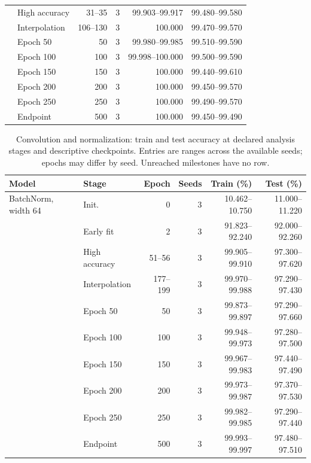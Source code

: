 \begin{table}[!htbp]
\begin{tabular}{llrrrr}
 & High accuracy & 31--35 & 3 & 99.903--99.917 & 99.480--99.580\\
 & Interpolation & 106--130 & 3 & 100.000 & 99.470--99.570\\
 & Epoch 50 & 50 & 3 & 99.980--99.985 & 99.510--99.590\\
 & Epoch 100 & 100 & 3 & 99.998--100.000 & 99.500--99.590\\
 & Epoch 150 & 150 & 3 & 100.000 & 99.440--99.610\\
 & Epoch 200 & 200 & 3 & 100.000 & 99.450--99.570\\
 & Epoch 250 & 250 & 3 & 100.000 & 99.490--99.570\\
 & Endpoint & 500 & 3 & 100.000 & 99.450--99.490\\
\bottomrule\end{tabular}\end{table}

\FloatBarrier
\begin{table}[!htbp]\centering
\caption{Convolution and normalization: train and test accuracy at declared analysis stages and descriptive checkpoints. Entries are ranges across the available seeds; epochs may differ by seed. Unreached milestones have no row.}\label{tab:perf-2-3}
\small\setlength{\tabcolsep}{4pt}
\begin{tabular}{llrrrr}\toprule
Model & Stage & Epoch & Seeds & Train (\%) & Test (\%)\\\midrule
BatchNorm, width 64 & Init. & 0 & 3 & 10.462--10.750 & 11.000--11.220\\
 & Early fit & 2 & 3 & 91.823--92.240 & 92.000--92.260\\
 & High accuracy & 51--56 & 3 & 99.905--99.910 & 97.300--97.620\\
 & Interpolation & 177--199 & 3 & 99.970--99.988 & 97.290--97.430\\
 & Epoch 50 & 50 & 3 & 99.873--99.897 & 97.290--97.660\\
 & Epoch 100 & 100 & 3 & 99.948--99.973 & 97.280--97.500\\
 & Epoch 150 & 150 & 3 & 99.967--99.983 & 97.440--97.490\\
 & Epoch 200 & 200 & 3 & 99.973--99.987 & 97.370--97.530\\
 & Epoch 250 & 250 & 3 & 99.982--99.985 & 97.290--97.440\\
 & Endpoint & 500 & 3 & 99.993--99.997 & 97.480--97.510\\
\bottomrule\end{tabular}\end{table}

